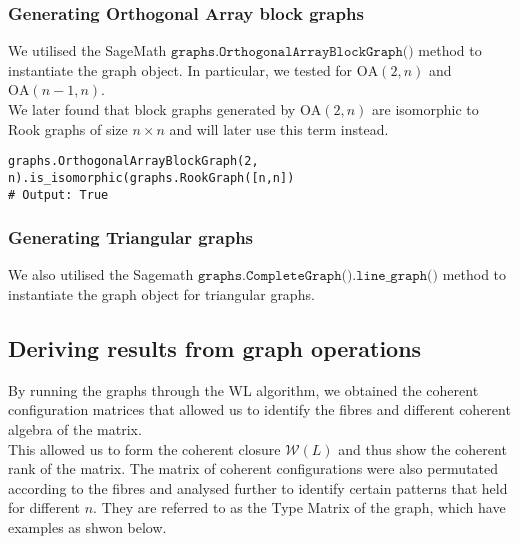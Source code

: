 \documentclass[12pt]{article}
\begin{document}
\subsubsection{Generating Orthogonal Array block graphs}
We utilised the SageMath \(\texttt{graphs.OrthogonalArrayBlockGraph()}\) \cite{sagemath_OA} method to instantiate the graph object. In particular, we tested for $\text{OA}(2, n)$ and $\text{OA}(n-1,n)$. \\
We later found that block graphs generated by $\text{OA}(2, n)$ are isomorphic to Rook graphs of size $n\times n$ and will later use this term instead.

\begin{verbatim}
graphs.OrthogonalArrayBlockGraph(2, n).is_isomorphic(graphs.RookGraph([n,n])
# Output: True
\end{verbatim}


\subsubsection{Generating Triangular graphs}
We also utilised the Sagemath \(\texttt{graphs.CompleteGraph().line\_graph()}\) \cite{sagemath_complete_graph}\cite{sagemath_line_graph} method to instantiate the graph object for triangular graphs. 

\subsection{Deriving results from graph operations}
By running the graphs through the WL algorithm, we obtained the coherent configuration matrices that allowed us to identify the fibres \cite{gary} and different coherent algebra of the matrix. \\
This allowed us to form the coherent closure $\mathcal{W}(L)$ and thus show the coherent rank of the matrix. The matrix of coherent configurations were also permutated according to the fibres and analysed further to identify certain patterns that held for different $n$. They are referred to as the Type Matrix of the graph, which have examples as shwon below.
\end{document}

